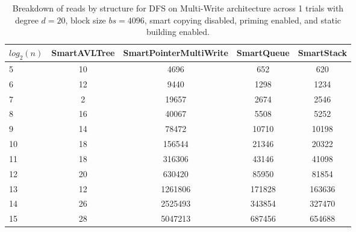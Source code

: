 \begin{table}[]
\centering
\begin{tabular}{|l|c|c|c|c|}
$log_2(n)$ & SmartAVLTree & SmartPointerMultiWrite & SmartQueue & SmartStack \\ \hline
5 & 10 & 4696 & 652 & 620 \\ \hline
6 & 12 & 9440 & 1298 & 1234 \\ \hline
7 & 2 & 19657 & 2674 & 2546 \\ \hline
8 & 16 & 40067 & 5508 & 5252 \\ \hline
9 & 14 & 78472 & 10710 & 10198 \\ \hline
10 & 18 & 156544 & 21346 & 20322 \\ \hline
11 & 18 & 316306 & 43146 & 41098 \\ \hline
12 & 20 & 630420 & 85950 & 81854 \\ \hline
13 & 12 & 1261806 & 171828 & 163636 \\ \hline
14 & 26 & 2525493 & 343854 & 327470 \\ \hline
15 & 28 & 5047213 & 687456 & 654688 \\ \hline
\end{tabular}
\caption{Breakdown of reads by structure for DFS on Multi-Write architecture across 1 trials with degree $d=20$, block size $bs=4096$, smart copying disabled, priming enabled, and static building enabled.}
    \label{tab:reads_by_structure_dfs_d20_bs4096_trials1_copiesfalse_primetrue_staticinsertiontrue_ptmultiwrite_movetrue}
\end{table}

